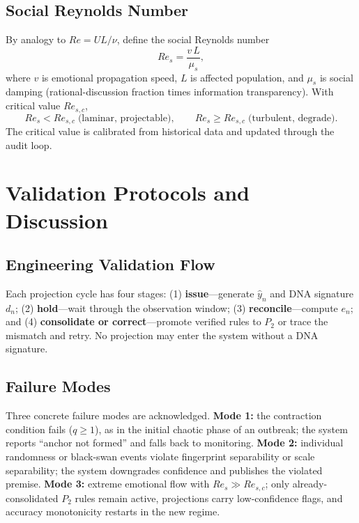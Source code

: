 \documentclass[10pt,a4paper]{article}
\theoremstyle{definition}
\begin{document}
\subsection{Social Reynolds Number}

By analogy to $Re=UL/\nu$, define the social Reynolds number
\begin{equation}\label{eq:Re_s}
Re_s = \frac{v\,L}{\mu_s},
\end{equation}
where $v$ is emotional propagation speed, $L$ is affected population, and $\mu_s$ is social damping (rational-discussion fraction times information transparency). With critical value $Re_{s,c}$,
\begin{equation}\label{eq:regime}
Re_s < Re_{s,c} \;\text{(laminar, projectable)}, \qquad
Re_s \ge Re_{s,c} \;\text{(turbulent, degrade)}.
\end{equation}
The critical value is calibrated from historical data and updated through the audit loop.

\section{Validation Protocols and Discussion}\label{sec:validation}

\subsection{Engineering Validation Flow}

Each projection cycle has four stages: (1) \textbf{issue}---generate $\hat{y}_n$ and DNA signature $d_n$; (2) \textbf{hold}---wait through the observation window; (3) \textbf{reconcile}---compute $e_n$; and (4) \textbf{consolidate or correct}---promote verified rules to $P_2$ or trace the mismatch and retry. No projection may enter the system without a DNA signature.

\subsection{Failure Modes}

Three concrete failure modes are acknowledged. \textbf{Mode 1:} the contraction condition fails ($q\ge 1$), as in the initial chaotic phase of an outbreak; the system reports ``anchor not formed'' and falls back to monitoring. \textbf{Mode 2:} individual randomness or black-swan events violate fingerprint separability or scale separability; the system downgrades confidence and publishes the violated premise. \textbf{Mode 3:} extreme emotional flow with $Re_s\gg Re_{s,c}$; only already-consolidated $P_2$ rules remain active, projections carry low-confidence flags, and accuracy monotonicity restarts in the new regime.
\end{document}
